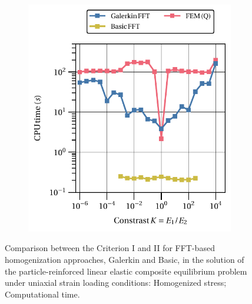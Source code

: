 \begin{figure}[hbt]
\begin{subfigure}[b]{0.49\textwidth}
    \includegraphics[width=\textwidth]{figures/linear_2D_normal_stress_avg_cpu_time_vs_n_voxels}
    \caption{}
    \label{subfig:linear_2D_normal_stress_avg_cpu_time_vs_n_voxels}
  \end{subfigure}
\caption{Comparison between the Criterion I and II for FFT-based homogenization approaches, Galerkin and Basic, in the
solution of the particle-reinforced linear elastic composite equilibrium problem under uniaxial
strain loading conditions:  Homogenized stress;  Computational time.}
\label{fig:linear_3D_normal_comparison_crit}
\end{figure}

